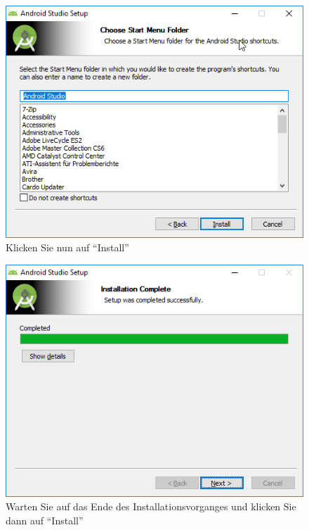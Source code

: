 \documentclass[a4paper,10pt,xetex]{article}
\begin{document}
\begin{figure}
  \centering
  \includegraphics[width=\textwidth]{Installation/1-5}
  \caption{Klicken Sie nun auf ``Install'' }
\end{figure}

\begin{figure}
  \centering
  \includegraphics[width=\textwidth]{Installation/1-7}
  \caption{Warten Sie auf das Ende des Installationsvorganges und klicken Sie dann auf ``Install'' }
\end{figure}
\end{document}
